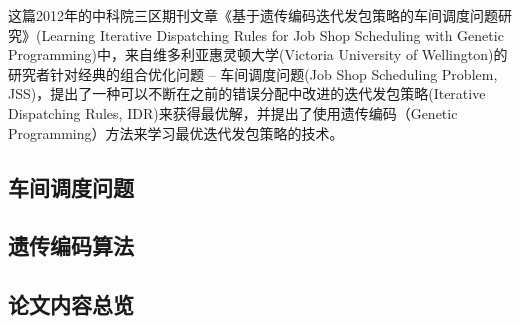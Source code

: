 这篇2012年的中科院三区期刊文章《基于遗传编码迭代发包策略的车间调度问题研究》(Learning Iterative Dispatching Rules for Job Shop Scheduling with Genetic Programming)中，来自维多利亚惠灵顿大学(Victoria University of Wellington)的研究者针对经典的组合优化问题 -- 车间调度问题(Job Shop Scheduling Problem, JSS)，提出了一种可以不断在之前的错误分配中改进的迭代发包策略(Iterative Dispatching Rules, IDR)来获得最优解，并提出了使用遗传编码（Genetic Programming）方法来学习最优迭代发包策略的技术。

\subsection{车间调度问题}

\subsection{遗传编码算法}

\subsection{论文内容总览}

